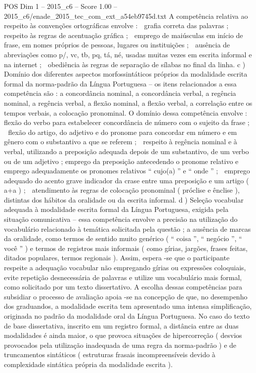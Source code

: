 \begin{textsample}{POS Dim 1 – 2015\_c6 – Score 1.00 – 2015\_c6/enade\_2015\_tec\_com\_ext\_a54eb9745d.txt}
A competência relativa ao respeito às convenções ortográficas envolve :  grafia correta das palavras ;  respeito às regras de acentuação gráfica ;  emprego de maiúsculas em início de frase, em nomes próprios de pessoas, lugares ou instituições ;  ausência de abreviações como p/, vc, tb, pq, tá, né, usadas muitas vezes em escrita informal e na internet ;  obediência às regras de separação de sílabas no final da linha. c ) Domínio dos diferentes aspectos morfossintáticos próprios da modalidade escrita formal da norma-padrão da Língua Portuguesa – os itens relacionados a essa competência são : a concordância nominal, a concordância verbal, a regência nominal, a regência verbal, a flexão nominal, a flexão verbal, a correlação entre os tempos verbais, a colocação pronominal.
O domínio dessa competência envolve :  flexão do verbo para estabelecer concordância de número com o sujeito da frase ;  flexão do artigo, do adjetivo e do pronome para concordar em número e em gênero com o substantivo a que se referem ;  respeito à regência nominal e à verbal, utilizando a preposição adequada depois de um substantivo, de um verbo ou de um adjetivo ; emprego da preposição antecedendo o pronome relativo e emprego adequadamente os pronomes relativos “ cujo(a) ” e “ onde ” ;  emprego adequado do acento grave indicador da crase entre uma preposição e um artigo ( a+a ) ;  atendimento às regras de colocação pronominal ( próclise e ênclise ), distintas dos hábitos da oralidade ou da escrita informal. d ) Seleção vocabular adequada à modalidade escrita formal da Língua Portuguesa, exigida pela situação comunicativa – essa competência envolve a precisão na utilização do vocabulário relacionado à temática solicitada pela questão ; a ausência de marcas da oralidade, como termos de sentido muito genérico ( “ coisa ”, “ negócio ”, “ você ” ) e termos de registros mais informais ( como gírias, jargões, frases feitas, ditados populares, termos regionais ).
Assim, espera -se que o participante respeite a adequação vocabular não empregando gírias ou expressões coloquiais, evite repetição desnecessária de palavras e utilize um vocabulário mais formal, como solicitado por um texto dissertativo.
A escolha dessas competências para subsidiar o processo de avaliação apoia -se na concepção de que, no desempenho dos graduandos, a modalidade escrita tem apresentado uma intensa simplificação, originada no padrão da modalidade oral da Língua Portuguesa.
No caso do texto de base dissertativa, inscrito em um registro formal, a distância entre as duas modalidades é ainda maior, o que provoca situações de hipercorreção ( desvios provocados pela utilização inadequada de uma regra da norma-padrão ) e de truncamentos sintáticos ( estruturas frasais incompreensíveis devido à complexidade sintática própria da modalidade escrita ).

\end{textsample}

